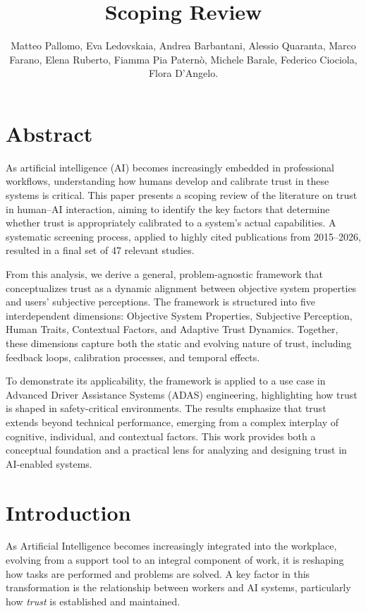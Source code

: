 \documentclass[sigconf]{acmart}
\title{Scoping Review}
\author{Matteo Pallomo, 
Eva Ledovskaia,
Andrea Barbantani,
Alessio Quaranta,
Marco Farano,
Elena Ruberto,
Fiamma Pia Paternò,
Michele Barale,
Federico Ciociola,
Flora D'Angelo.}
\affiliation{
  \institution{Politecnico di Torino}
  \city{Turin}
  \country{Italy - 2026}
}
\begin{document}
\makeatletter
\fancyhead{}
\renewcommand{\headrulewidth}{0pt}
\makeatother
\maketitle 

\section{Abstract}

As artificial intelligence (AI) becomes increasingly embedded in professional workflows, understanding how humans develop and calibrate trust in these systems is critical. This paper presents a scoping review of the literature on trust in human–AI interaction, aiming to identify the key factors that determine whether trust is appropriately calibrated to a system’s actual capabilities. A systematic screening process, applied to highly cited publications from 2015–2026, resulted in a final set of 47 relevant studies.

From this analysis, we derive a general, problem-agnostic framework that conceptualizes trust as a dynamic alignment between objective system properties and users’ subjective perceptions. The framework is structured into five interdependent dimensions: Objective System Properties, Subjective Perception, Human Traits, Contextual Factors, and Adaptive Trust Dynamics. Together, these dimensions capture both the static and evolving nature of trust, including feedback loops, calibration processes, and temporal effects.

To demonstrate its applicability, the framework is applied to a use case in Advanced Driver Assistance Systems (ADAS) engineering, highlighting how trust is shaped in safety-critical environments. The results emphasize that trust extends beyond technical performance, emerging from a complex interplay of cognitive, individual, and contextual factors. This work provides both a conceptual foundation and a practical lens for analyzing and designing trust in AI-enabled systems.


\section{Introduction}

As Artificial Intelligence becomes increasingly integrated into the workplace, evolving from a support tool to an integral component of work, it is reshaping how tasks are performed and problems are solved. A key factor in this transformation is the relationship between workers and AI systems, particularly how \emph{trust} is established and maintained.
\end{document}
